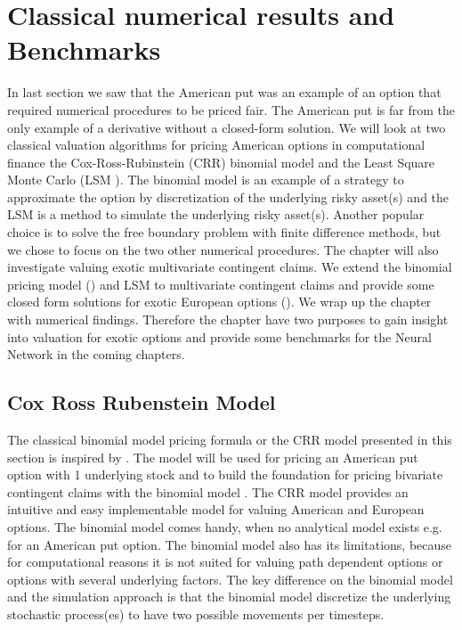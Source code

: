 \chapter{Classical numerical results and Benchmarks} %

\label{Chapter3} %

In last section we saw that the American put was an example of an option that required numerical procedures to be priced fair. The American put is far from the only example of a derivative without a closed-form solution. We will look at two classical valuation algorithms for pricing American options in computational finance the Cox-Ross-Rubinstein (CRR) binomial model \parencite{CRR} and the Least Square Monte Carlo (LSM \parencite{LSM}). The binomial model is an example of a strategy to approximate the option by discretization of the underlying risky asset(s) and the LSM is a method to simulate the underlying risky asset(s). Another popular choice is to solve the free boundary problem with finite difference methods, but we chose to focus on the two other numerical procedures. The chapter will also investigate valuing exotic multivariate contingent claims. We extend the binomial pricing model (\parencite{NEK,BEG}) and LSM to multivariate contingent claims and provide some closed form solutions for exotic European options (\parencite{Johnson87, Ouwehand2006}). We wrap up the chapter with numerical findings. Therefore the chapter have two purposes to gain insight into valuation for exotic options and provide some benchmarks for the Neural Network in the coming chapters.

\section{Cox Ross Rubenstein Model}\label{CRR}
The classical binomial model pricing formula or the CRR model presented in this section is inspired by \parencite{CRR,Hull,finKont}. The model will be used for pricing an American put option with 1 underlying stock and to build the foundation for pricing bivariate contingent claims with the binomial model \parencite{BEG}. The CRR model provides an intuitive and easy implementable model for valuing American and European options. The binomial model comes handy, when no analytical model exists e.g. for an American put option. The binomial model also has its limitations, because for computational reasons it is not suited for valuing path dependent options or options with several underlying factors. The key difference on the binomial model and the simulation approach is that the binomial model discretize the underlying stochastic process(es) to have two possible movements per timesteps. \\

